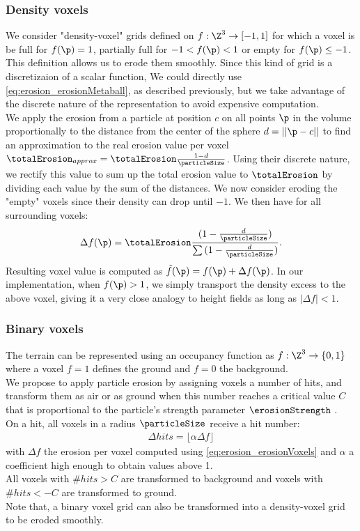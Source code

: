 \subsubsection{Density voxels}
\label{sec:erosion_application_on_density_voxels}
We consider "density-voxel" grids defined on $f: \Z^3 \to [-1, 1]$ for which a voxel is be full for $f(\p) = 1$, partially full for $-1 < f(\p) < 1$ or empty for $f(\p) \leq -1$. 
This definition allows us to erode them smoothly. 
Since this kind of grid is a discretizaion of a scalar function, We could directly use \eqref{eq:erosion_erosionMetaball}, as described previously, but we take advantage of the discrete nature of the representation to avoid expensive computation. \\
We apply the erosion from a particle at position $c$ on all points $\p$ in the volume proportionally to the distance from the center of the sphere $d = ||\p - c||$ to find an approximation to the real erosion value per voxel $\totalErosion_{approx} = \totalErosion \frac{1 - d}{\particleSize}$.
Using their discrete nature, we rectify this value to sum up the total erosion value to $\totalErosion$ by dividing each value by the sum of the distances. We now consider eroding the "empty" voxels since their density can drop until $-1$. We then have for all surrounding voxels: 
\begin{align} \label{eq:erosion_erosionVoxels}
\Delta f(\p) = \totalErosion \frac{ (1 - \frac{d}{\particleSize} )}{ \sum {(1 - \frac{d}{\particleSize})}}.
\end{align}
Resulting voxel value is computed as $\Tilde{f}(\p) = f(\p) + \Delta f(\p)$.
In our implementation, when $f(\p) > 1$, we simply transport the density excess to the above voxel, giving it a very close analogy to height fields as long as $|\Delta f| < 1$. 

\subsubsection{Binary voxels}
\label{sec:erosion_application_on_binary_voxels}
The terrain can be represented using an occupancy function as $f: \Z^3 \to \{0, 1\}$ where a voxel $f = 1$ defines the ground and $f = 0$ the background. \\ 
We propose to apply particle erosion by assigning voxels a number of hits, and transform them as air or as ground when this number reaches a critical value $C$ that is proportional to the particle's strength parameter $\erosionStrength$ \cite{Jones2010}. \\ 
On a hit, all voxels in a radius $\particleSize$ receive a hit number: 
\begin{align} \label{eq:erosion_erosionDiscreteVoxels}
\Delta hits = \lfloor \alpha \Delta f \rfloor
\end{align}
with $\Delta f$ the erosion per voxel computed using \eqref{eq:erosion_erosionVoxels} and $\alpha$ a coefficient high enough to obtain values above 1. \\ 
All voxels with $\# hits > C$ are transformed to background and voxels with $\# hits < -C$ are transformed to ground.\\
Note that, a binary voxel grid can also be transformed into a density-voxel grid to be eroded smoothly.

